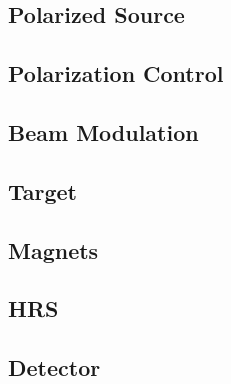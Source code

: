 \subsection{Polarized Source}

\subsection{Polarization Control}

\subsection{Beam Modulation}

\subsection{Target}

\subsection{Magnets}

\subsection{HRS}

\subsection{Detector}
